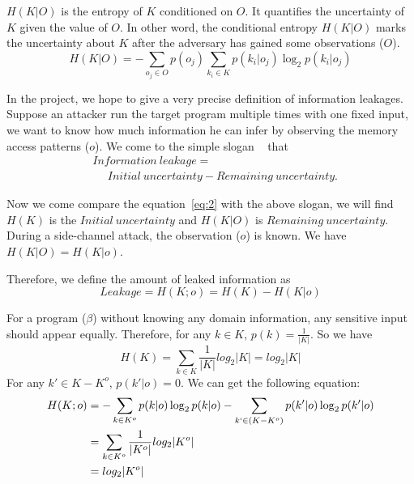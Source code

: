 $H(K|O)$ is the entropy of $K$ conditioned on $O$. It quantifies the uncertainty of $K$
given the value of $O$. In other word, the conditional entropy $H(K|O)$ marks the 
uncertainty about $K$ after the adversary has gained some observations ($O$). 
\begin{equation}
    H(K|O) = - \sum_{o_j {\in} O} {p(o_j) \sum_{k_i {\in} K}{p(k_i|o_j)\log_2p(k_i|o_j)}}
\end{equation}

In the project, we hope to give a very precise definition of information leakages. 
Suppose an attacker run the target program multiple times with one fixed input, we
want to know how much information he can infer by observing the memory access patterns ($o$).
We come to the simple slogan ~\cite{10.1007/978-3-642-00596-1_21} %
that
\begin{align*}
 & \mathit{Information\ leakage} = \\
 & ~~~~~~ \mathit{Initial\ uncertainty} - \mathit{Remaining\ uncertainty}. 
\end{align*}

Now we come compare the equation~\ref{eq:2} with the above slogan, we will
find $H(K)$ is the $\mathit{Initial\ uncertainty}$ and $H(K|O)$ is
$\mathit{Remaining\ uncertainty}$. During a side-channel attack, 
the observation ($o$) is known.  We have $H(K|O) = H(K|o)$.

Therefore, we define the amount of leaked information as 
\begin{displaymath}
    Leakage = H(K;o) = H(K) - H(K|o)
\end{displaymath}

For a program ($\beta$) without knowing any domain information, any sensitive
input should appear equally. Therefore, for any $k \in K$, $p(k) = \frac{1}{|K|}$.
So we have 
$$H(K) = \sum_{k {\in} K}\frac{1}{|K|}log_2{|K|} = log_2{|K|}$$
For any $k' \in K - K^o$, $p(k'|o) = 0$. We can get the following equation:
\begin{align*}
H(K;o) &= - \sum_{k {\in} K^o}{p(k|o)\log_2p(k|o)} 
          - \sum_{k` {\in} (K - K^o)}{p(k'|o)\log_2p(k'|o)}\\
       &= \sum_{k {\in} K^o}\frac{1}{|K^o|}log_2{|K^o|}\\
       &= log_2{|K^o|}
\end{align*}

\newtheorem{mydef}{Definition}

